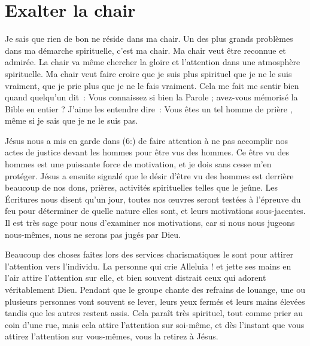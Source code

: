 \section*{Exalter la chair}

Je sais que rien de bon ne réside dans ma chair.
 Un des plus grands problèmes dans ma démarche spirituelle, c'est ma chair.
 Ma chair veut être reconnue et admirée. La chair va même chercher
 la gloire et l'attention dans une atmosphère spirituelle.
 Ma chair veut faire croire que je suis plus spirituel que je ne le suis
 vraiment, que je prie plus que je ne le fais vraiment.
 Cela me fait me sentir bien quand quelqu'un dit~:
 \og Vous connaissez si bien la Parole ; avez-vous mémorisé la Bible
 en entier ? \fg{} J'aime les entendre dire~:
 \og Vous êtes un tel homme de prière \fg{}, même si je sais
 que je ne le suis pas.

Jésus nous a mis en garde dans (6:) de faire attention
 à ne pas accomplir nos actes de justice devant les hommes
 pour être vus des hommes. Ce \og être vu des hommes \fg{} est une
 puissante force de motivation, et je dois sans cesse m'en protéger.
 Jésus a ensuite signalé que le désir d'être vu des hommes
 est derrière beaucoup de nos dons, prières, activités spirituelles
 telles que le jeûne. Les Écritures nous disent qu'un jour,
 toutes nos œuvres seront testées à l'épreuve du feu pour déterminer
 de quelle nature elles sont, et leurs motivations sous-jacentes.
 Il est très sage pour nous d'examiner nos motivations,
 car si nous nous jugeons nous-mêmes, nous ne serons pas jugés par Dieu.

Beaucoup des choses faites lors des services charismatiques
 le sont pour attirer l'attention vers l'individu.
 La personne qui crie \og Alleluia ! \fg{} et jette ses mains en l'air
 attire l'attention sur elle, et bien souvent distrait ceux qui adorent
 véritablement Dieu. Pendant que le groupe chante des refrains de louange,
 une ou plusieurs personnes vont souvent se lever, leurs yeux fermés
 et leurs mains élevées tandis que les autres restent assis.
 Cela paraît très spirituel, tout comme prier au coin d'une rue,
 mais cela attire l'attention sur soi-même, et dès l'instant
 que vous attirez l'attention sur vous-mêmes, vous la retirez à Jésus.

